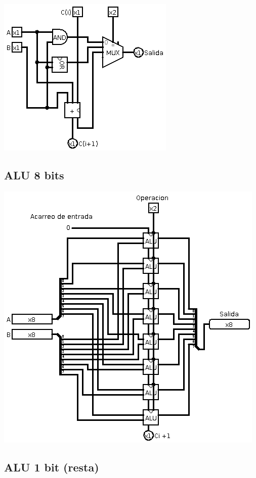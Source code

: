 \documentclass[12pt, letterpaper]{article}
\begin{document}
        \begin{center}
          \includegraphics[scale=0.6]{alu_1.png}
        \end{center}

      \subsection*{ALU 8 bits}

        \begin{center}
          \includegraphics[scale=0.6]{alu_8.png}
        \end{center}

      \subsection*{ALU 1 bit (resta)}
\end{document}
